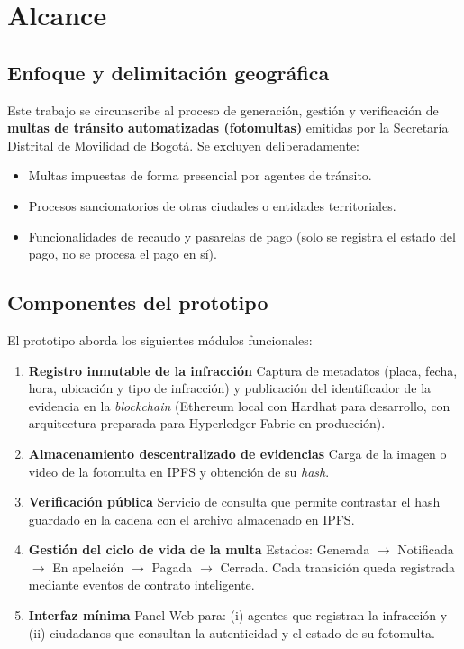 \section{Alcance}

\subsection{Enfoque y delimitación geográfica}
Este trabajo se circunscribe al proceso de generación, gestión y verificación de \textbf{multas de tránsito automatizadas (fotomultas)} emitidas por la Secretaría Distrital de Movilidad de Bogotá.  Se excluyen deliberadamente:
\begin{itemize}
  \item Multas impuestas de forma presencial por agentes de tránsito.
  \item Procesos sancionatorios de otras ciudades o entidades territoriales.
  \item Funcionalidades de recaudo y pasarelas de pago (solo se registra el estado del pago, no se procesa el pago en sí).
\end{itemize}

\subsection{Componentes del prototipo}
El prototipo aborda los siguientes módulos funcionales:

\begin{enumerate}
  \item \textbf{Registro inmutable de la infracción}
        Captura de metadatos (placa, fecha, hora, ubicación y tipo de infracción) y publicación del identificador de la evidencia en la \emph{blockchain} (Ethereum local con Hardhat para desarrollo, con arquitectura preparada para Hyperledger Fabric en producción).
  \item \textbf{Almacenamiento descentralizado de evidencias}  
        Carga de la imagen o video de la fotomulta en IPFS y obtención de su \emph{hash}.
  \item \textbf{Verificación pública}  
        Servicio de consulta que permite contrastar el hash guardado en la cadena con el archivo almacenado en IPFS.
  \item \textbf{Gestión del ciclo de vida de la multa}  
        Estados: \textsf{Generada} $\rightarrow$ \textsf{Notificada} $\rightarrow$ \textsf{En apelación} $\rightarrow$ \textsf{Pagada} $\rightarrow$ \textsf{Cerrada}.  
        Cada transición queda registrada mediante eventos de contrato inteligente.
  \item \textbf{Interfaz mínima}  
        Panel Web para: (i) agentes que registran la infracción y (ii) ciudadanos que consultan la autenticidad y el estado de su fotomulta.
\end{enumerate}

